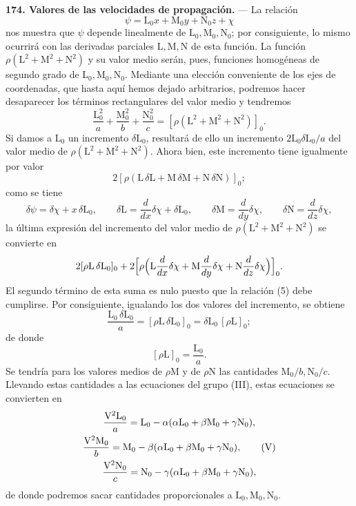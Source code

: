 \noindent\textbf{174. Valores de las velocidades de propagación.} — La
relación
\[
\psi=\mathrm L_0x+\mathrm M_0y+\mathrm N_0z+\chi
\]
nos muestra que $\psi$ depende linealmente de $\mathrm L_0,\mathrm
M_0,\mathrm N_0$; por consiguiente, lo mismo ocurrirá con las derivadas
parciales $\mathrm L,\mathrm M,\mathrm N$ de esta función. La función
$\rho(\mathrm L^2+\mathrm M^2+\mathrm N^2)$ y su valor medio serán, pues,
funciones homogéneas de segundo grado de $\mathrm L_0,\mathrm M_0,\mathrm
N_0$. Mediante una elección conveniente de los ejes de coordenadas, que
hasta aquí hemos dejado arbitrarios, podremos hacer desaparecer los
términos rectangulares del valor medio y tendremos
\[
\frac{\mathrm L_0^2}{a}+\frac{\mathrm M_0^2}{b}+\frac{\mathrm N_0^2}{c}=[\rho(\mathrm L^2+\mathrm M^2+\mathrm N^2)]_0.
\]
Si damos a $\mathrm L_0$ un incremento $\delta \mathrm L_0$, resultará de
ello un incremento $2\mathrm L_0\delta \mathrm L_0/a$ del valor medio de
$\rho(\mathrm L^2+\mathrm M^2+\mathrm N^2)$. Ahora bien, este incremento
tiene igualmente por valor
\[
2[\rho(\mathrm L\,\delta \mathrm L+\mathrm M\,\delta \mathrm M+\mathrm N\,\delta \mathrm N)]_0;
\]
como se tiene
\[
\delta\psi=\delta\chi+x\,\delta \mathrm L_0,\qquad
\delta \mathrm L=\frac{d}{dx}\delta\chi+\delta \mathrm L_0,\qquad
\delta \mathrm M=\frac{d}{dy}\delta\chi,\qquad
\delta \mathrm N=\frac{d}{dz}\delta\chi,
\]
la última expresión del incremento del valor medio de
$\rho(\mathrm L^2+\mathrm M^2+\mathrm N^2)$ se convierte en
\[
2[\rho \mathrm L\,\delta \mathrm L_0]_0+2\Bigl[\rho\Bigl(\mathrm L\frac{d}{dx}\delta\chi
+\mathrm M\frac{d}{dy}\delta\chi+\mathrm N\frac{d}{dz}\delta\chi\Bigr)\Bigr]_0.
\]
El segundo término de esta suma es nulo puesto que la relación (5) debe
cumplirse. Por consiguiente, igualando los dos valores del incremento, se
obtiene
\[
\frac{\mathrm L_0\,\delta \mathrm L_0}{a}=[\rho \mathrm L\,\delta \mathrm L_0]_0=\delta \mathrm L_0\,[\rho \mathrm L]_0;
\]
de donde
\[
[\rho \mathrm L]_0=\frac{\mathrm L_0}{a}.
\]
Se tendría para los valores medios de $\rho \mathrm M$ y de $\rho \mathrm
N$ las cantidades $\mathrm M_0/b,\mathrm N_0/c$. Llevando estas cantidades
a las ecuaciones del grupo (III), estas ecuaciones se convierten en
\begin{gather}
\frac{\mathrm V^2\mathrm L_0}{a}=\mathrm L_0-\alpha(\alpha \mathrm L_0+\beta \mathrm M_0+\gamma \mathrm N_0),\notag\\
\frac{\mathrm V^2\mathrm M_0}{b}=\mathrm M_0-\beta(\alpha \mathrm L_0+\beta \mathrm M_0+\gamma \mathrm N_0),
\tag{V}\\
\frac{\mathrm V^2\mathrm N_0}{c}=\mathrm N_0-\gamma(\alpha \mathrm L_0+\beta \mathrm M_0+\gamma \mathrm N_0),\notag
\end{gather}
de donde podremos sacar cantidades proporcionales a $\mathrm L_0,\mathrm
M_0,\mathrm N_0$.

